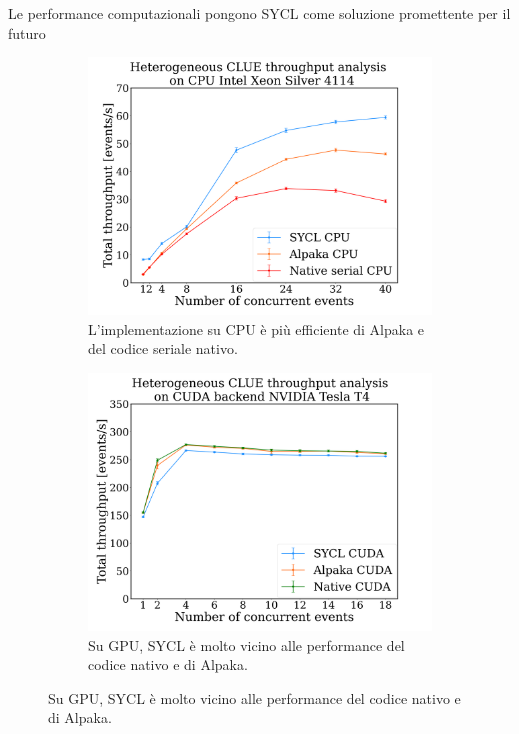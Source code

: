 \documentclass{beamer}
\begin{document}
\begin{frame}{Le performance computazionali pongono SYCL come soluzione promettente per il futuro}

\begin{figure}
    \centering
    \begin{subfigure}[t]{0.49\textwidth}
    \includegraphics[width=\textwidth]{media/presentazione/hCLUE_cpu_performance.png}
    \caption{L'implementazione su CPU è più efficiente di Alpaka e del codice seriale nativo.}
    \end{subfigure}
    \begin{subfigure}[t]{0.49\textwidth}
    \includegraphics[width=\textwidth]{media/presentazione/hCLUE_cuda_performance.png}
    \caption{Su GPU, SYCL è molto vicino alle performance del codice nativo e di Alpaka.}
    \end{subfigure}
\end{figure}
    
\end{frame}
\end{document}
